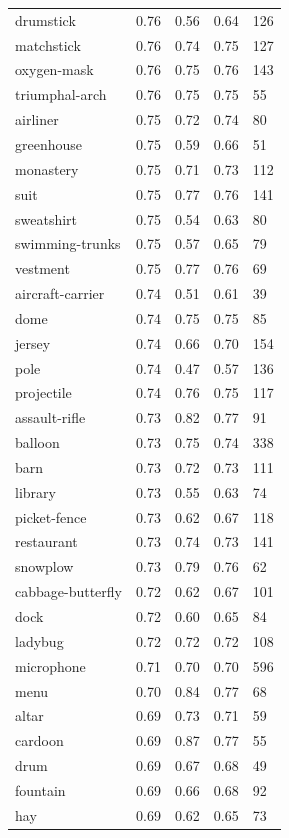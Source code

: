 \begin{center}
\begin{longtable}{lllll}
drumstick & 0.76 & 0.56 & 0.64 & 126 \\
matchstick & 0.76 & 0.74 & 0.75 & 127 \\
oxygen-mask & 0.76 & 0.75 & 0.76 & 143 \\
triumphal-arch & 0.76 & 0.75 & 0.75 & 55 \\
airliner & 0.75 & 0.72 & 0.74 & 80 \\
greenhouse & 0.75 & 0.59 & 0.66 & 51 \\
monastery & 0.75 & 0.71 & 0.73 & 112 \\
suit & 0.75 & 0.77 & 0.76 & 141 \\
sweatshirt & 0.75 & 0.54 & 0.63 & 80 \\
swimming-trunks & 0.75 & 0.57 & 0.65 & 79 \\
vestment & 0.75 & 0.77 & 0.76 & 69 \\
aircraft-carrier & 0.74 & 0.51 & 0.61 & 39 \\
dome & 0.74 & 0.75 & 0.75 & 85 \\
jersey & 0.74 & 0.66 & 0.70 & 154 \\
pole & 0.74 & 0.47 & 0.57 & 136 \\
projectile & 0.74 & 0.76 & 0.75 & 117 \\
assault-rifle & 0.73 & 0.82 & 0.77 & 91 \\
balloon & 0.73 & 0.75 & 0.74 & 338 \\
barn & 0.73 & 0.72 & 0.73 & 111 \\
library & 0.73 & 0.55 & 0.63 & 74 \\
picket-fence & 0.73 & 0.62 & 0.67 & 118 \\
restaurant & 0.73 & 0.74 & 0.73 & 141 \\
snowplow & 0.73 & 0.79 & 0.76 & 62 \\
cabbage-butterfly & 0.72 & 0.62 & 0.67 & 101 \\
dock & 0.72 & 0.60 & 0.65 & 84 \\
ladybug & 0.72 & 0.72 & 0.72 & 108 \\
microphone & 0.71 & 0.70 & 0.70 & 596 \\
menu & 0.70 & 0.84 & 0.77 & 68 \\
altar & 0.69 & 0.73 & 0.71 & 59 \\
cardoon & 0.69 & 0.87 & 0.77 & 55 \\
drum & 0.69 & 0.67 & 0.68 & 49 \\
fountain & 0.69 & 0.66 & 0.68 & 92 \\
hay & 0.69 & 0.62 & 0.65 & 73 \\

\end{longtable}
\end{center}
